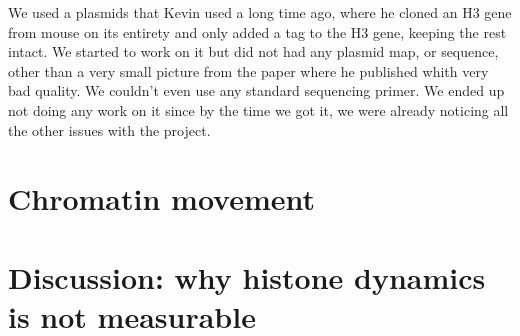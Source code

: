   We used a plasmids that Kevin used a long time ago, where he cloned an H3 gene from mouse on its
  entirety and only added a tag to the H3 gene, keeping the rest intact. We started to work on it but did not had any plasmid map,
  or sequence, other than a very small picture from the paper where he published whith very
  bad quality. We couldn't even use any standard sequencing primer. We ended up not doing
  any work on it since by the time we got it, we were already noticing all
  the other issues with the project.

  


\section{Chromatin movement}







\section{Discussion: why histone dynamics is not measurable}

